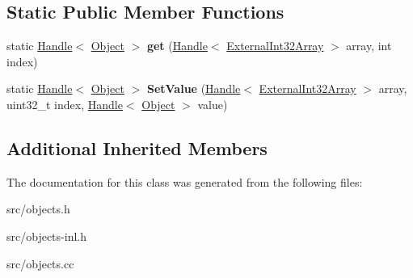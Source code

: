 \subsection*{Static Public Member Functions}
\begin{DoxyCompactItemize}
\item 
\hypertarget{classv8_1_1internal_1_1_external_int32_array_a1563becd3c62af476ac6065abd9c1ea0}{}static \hyperlink{classv8_1_1internal_1_1_handle}{Handle}$<$ \hyperlink{classv8_1_1internal_1_1_object}{Object} $>$ {\bfseries get} (\hyperlink{classv8_1_1internal_1_1_handle}{Handle}$<$ \hyperlink{classv8_1_1internal_1_1_external_int32_array}{External\+Int32\+Array} $>$ array, int index)\label{classv8_1_1internal_1_1_external_int32_array_a1563becd3c62af476ac6065abd9c1ea0}

\item 
\hypertarget{classv8_1_1internal_1_1_external_int32_array_a0bcb35ff5a6f0b565a704d24a91ee08b}{}static \hyperlink{classv8_1_1internal_1_1_handle}{Handle}$<$ \hyperlink{classv8_1_1internal_1_1_object}{Object} $>$ {\bfseries Set\+Value} (\hyperlink{classv8_1_1internal_1_1_handle}{Handle}$<$ \hyperlink{classv8_1_1internal_1_1_external_int32_array}{External\+Int32\+Array} $>$ array, uint32\+\_\+t index, \hyperlink{classv8_1_1internal_1_1_handle}{Handle}$<$ \hyperlink{classv8_1_1internal_1_1_object}{Object} $>$ value)\label{classv8_1_1internal_1_1_external_int32_array_a0bcb35ff5a6f0b565a704d24a91ee08b}

\end{DoxyCompactItemize}
\subsection*{Additional Inherited Members}


The documentation for this class was generated from the following files\+:\begin{DoxyCompactItemize}
\item 
src/objects.\+h\item 
src/objects-\/inl.\+h\item 
src/objects.\+cc\end{DoxyCompactItemize}
